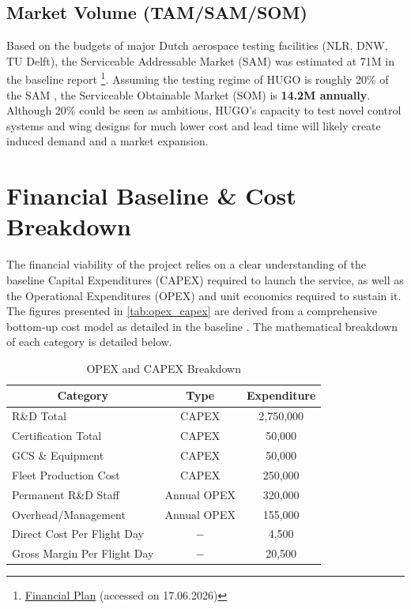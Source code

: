\subsection{Market Volume (TAM/SAM/SOM)}
\label{subsec:TAMSAMSOM}

Based on the budgets of major Dutch aerospace testing facilities (NLR, DNW, TU Delft), the Serviceable Addressable Market (SAM) was estimated at \texteuro{}71M in the baseline report \footnote{\label{foot:financialplan}\href{https://github.com/Teo-Cokonaj/DSE-28/blob/main/docs/excel-files/financial-plan.xlsm}{Financial Plan} (accessed on 17.06.2026)}. Assuming the testing regime of HUGO is roughly 20\% of the SAM , the Serviceable Obtainable Market (SOM) is \textbf{\texteuro{}14.2M annually}. Although 20\% could be seen as ambitious, HUGO's capacity to test novel control systems and wing designs for much lower cost and lead time will likely create induced demand and a market expansion.

\section{Financial Baseline \& Cost Breakdown}
\label{sec:financial_baseline}

The financial viability of the project relies on a clear understanding of the baseline Capital Expenditures (CAPEX) required to launch the service, as well as the Operational Expenditures (OPEX) and unit economics required to sustain it. The figures presented in \autoref{tab:opex_capex} are derived from a comprehensive bottom-up cost model as detailed in the baseline . The mathematical breakdown of each category is detailed below.

\begin{table}[H]
    \centering
    \caption{OPEX and CAPEX Breakdown}
    \label{tab:opex_capex}
    \begin{tabular}{|l|c|c|}
        \hline
        \multicolumn{1}{|c|}{\textbf{Category}} & \textbf{Type} & \textbf{Expenditure} \\
        \hline\hline
        R\&D Total & CAPEX                 & \texteuro{}2,750,000 \\\hline
        Certification Total & CAPEX         & \texteuro{}50,000 \\\hline
        GCS \& Equipment & CAPEX              & \texteuro{}50,000 \\\hline
        Fleet Production Cost & CAPEX       & \texteuro{}250,000 \\\hline
        Permanent R\&D Staff & Annual OPEX   & \texteuro{}320,000 \\\hline
        Overhead/Management & Annual OPEX   & \texteuro{}155,000 \\\hline
        Direct Cost Per Flight Day   & $-$        & \texteuro{}4,500 \\\hline
        Gross Margin Per Flight Day  & $-$       & \texteuro{}20,500 \\\hline
    \end{tabular}
\end{table}

